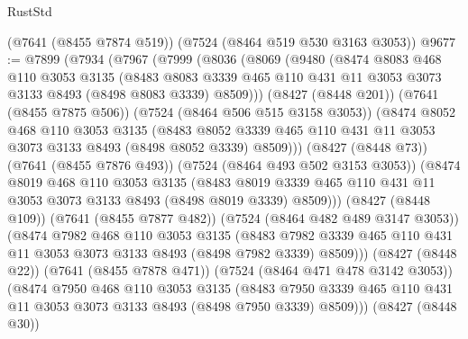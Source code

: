 \begin{lexlean}{RustStd}
\begin{coremodule}
    (@7641 (@8455 @7874 @519))
    (@7524 (@8464 @519 @530 @3163 @3053))
@9677 := @7899
    (@7934
      (@7967
        (@7999
          (@8036
            (@8069
              (@9480
                (@8474
                  @8083
                  @468
                  @110
                  @3053
                  @3135
                  (@8483
                    @8083
                    @3339
                    @465
                    @110
                    @431
                    @11
                    @3053
                    @3073
                    @3133
                    @8493
                    (@8498 @8083 @3339)
                    @8509)))
              (@8427 (@8448 @201))
              (@7641 (@8455 @7875 @506))
              (@7524 (@8464 @506 @515 @3158 @3053))
              (@8474
                @8052
                @468
                @110
                @3053
                @3135
                (@8483
                  @8052
                  @3339
                  @465
                  @110
                  @431
                  @11
                  @3053
                  @3073
                  @3133
                  @8493
                  (@8498 @8052 @3339)
                  @8509)))
            (@8427 (@8448 @73))
            (@7641 (@8455 @7876 @493))
            (@7524 (@8464 @493 @502 @3153 @3053))
            (@8474
              @8019
              @468
              @110
              @3053
              @3135
              (@8483
                @8019
                @3339
                @465
                @110
                @431
                @11
                @3053
                @3073
                @3133
                @8493
                (@8498 @8019 @3339)
                @8509)))
          (@8427 (@8448 @109))
          (@7641 (@8455 @7877 @482))
          (@7524 (@8464 @482 @489 @3147 @3053))
          (@8474
            @7982
            @468
            @110
            @3053
            @3135
            (@8483
              @7982
              @3339
              @465
              @110
              @431
              @11
              @3053
              @3073
              @3133
              @8493
              (@8498 @7982 @3339)
              @8509)))
        (@8427 (@8448 @22))
        (@7641 (@8455 @7878 @471))
        (@7524 (@8464 @471 @478 @3142 @3053))
        (@8474
          @7950
          @468
          @110
          @3053
          @3135
          (@8483 @7950 @3339 @465 @110 @431 @11 @3053 @3073 @3133 @8493 (@8498 @7950 @3339) @8509)))
      (@8427 (@8448 @30))

\end{coremodule}
\end{lexlean}
